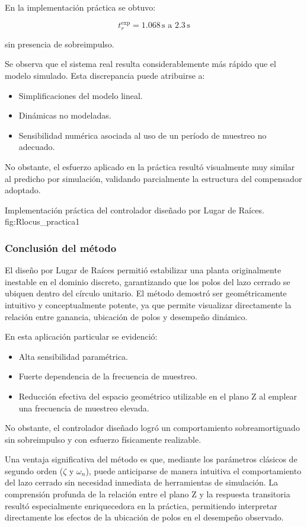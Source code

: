 En la implementación práctica se obtuvo:

\[
t_r^{\text{exp}} = 1.068\,\text{s} \text{ a } 2.3\,\text{s}
\]

sin presencia de sobreimpulso.

Se observa que el sistema real resulta considerablemente más rápido que el modelo simulado. Esta discrepancia puede atribuirse a:

\begin{itemize}
	\item Simplificaciones del modelo lineal.
	\item Dinámicas no modeladas.
	\item Sensibilidad numérica asociada al uso de un período de muestreo no adecuado.
\end{itemize}

No obstante, el esfuerzo aplicado en la práctica resultó visualmente muy similar al predicho por simulación, validando parcialmente la estructura del compensador adoptado.

{Implementación práctica del controlador diseñado por Lugar de Raíces.}
{fig:Rlocus_practica}{1}
\balance
\newpage

\subsubsection{Conclusión del método}

El diseño por Lugar de Raíces permitió estabilizar una planta originalmente inestable en el dominio discreto, garantizando que los polos del lazo cerrado se ubiquen dentro del círculo unitario.
El método demostró ser geométricamente intuitivo y conceptualmente potente, ya que permite visualizar directamente la relación entre ganancia, ubicación de polos y desempeño dinámico.

En esta aplicación particular se evidenció:

\begin{itemize}
	\item Alta sensibilidad paramétrica.
	\item Fuerte dependencia de la frecuencia de muestreo.
	\item Reducción efectiva del espacio geométrico utilizable en el plano Z al emplear una frecuencia de muestreo elevada.
\end{itemize}

No obstante, el controlador diseñado logró un comportamiento sobreamortiguado sin sobreimpulso y con esfuerzo físicamente realizable.

Una ventaja significativa del método es que, mediante los parámetros clásicos de segundo orden (\(\zeta\) y \(\omega_n\)), puede anticiparse de manera intuitiva el comportamiento del lazo cerrado sin necesidad inmediata de herramientas de simulación. La comprensión profunda de la relación entre el plano Z y la respuesta transitoria resultó especialmente enriquecedora en la práctica, permitiendo interpretar directamente los efectos de la ubicación de polos en el desempeño observado.
